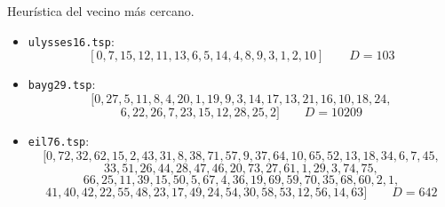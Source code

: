 \documentclass[10pt, xcolor=table]{beamer}
\begin{document}
\begin{frame}[fragile]{Heurística del vecino más cercano. }
\begin{itemize}
	\item \texttt{ulysses16.tsp}:
	\[
		[0,7,15,12,11,13,6,5,14,4,8,9,3,1,2,10] \qquad D = 103
	\]

	\item \texttt{bayg29.tsp}:
	\[
		[0,27,5,11,8,4,20,1,19,9,3,14,17,13,21,16,10,18,24,
	\]
	\[
		6,22,26,7,23,15,12,28,25,2] \qquad D = 10209
	\]
	
	\item \texttt{eil76.tsp}:
	\[
		[0,72,32,62,15,2,43,31,8,38,71,57,9,37,64,10,65,52,13,18,34,6,7,45,
	\]
	\[
		33,51,26,44,28, 47,46,20,73, 27, 61,1,29,3,74,75,
	\]
	\[
		66,25,11,39,15,50,5,67,4,36,19,69,59,70,35,68,60,2,1,
	\]
	\[
		41,40,42,22,55,48,23,17,49,24,54,30,58,53,12,56,14,63] \qquad D = 642
	\]
\end{itemize}
\end{frame}
\end{document}
